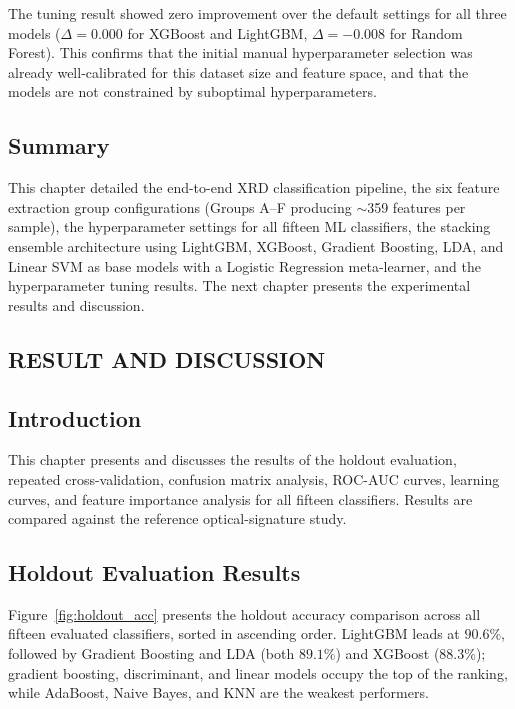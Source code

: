 \documentclass[12pt, oneside]{article} %
\begin{document}
The tuning result showed zero improvement over the default settings for all three models ($\Delta = 0.000$ for XGBoost and LightGBM, $\Delta = -0.008$ for Random Forest). This confirms that the initial manual hyperparameter selection was already well-calibrated for this dataset size and feature space, and that the models are not constrained by suboptimal hyperparameters.


\subsection{Summary}

This chapter detailed the end-to-end XRD classification pipeline, the six feature extraction group configurations (Groups A--F producing $\sim$359 features per sample), the hyperparameter settings for all fifteen ML classifiers, the stacking ensemble architecture using LightGBM, XGBoost, Gradient Boosting, LDA, and Linear SVM as base models with a Logistic Regression meta-learner, and the hyperparameter tuning results. The next chapter presents the experimental results and discussion.



\vfill \null

\newpage

\vfill \null
\thispagestyle{empty}
\begin{center}
\section{RESULT AND DISCUSSION}
\end{center}
\vspace{2cm}


\subsection{Introduction}

This chapter presents and discusses the results of the holdout evaluation, repeated cross-validation, confusion matrix analysis, ROC-AUC curves, learning curves, and feature importance analysis for all fifteen classifiers. Results are compared against the reference optical-signature study.


\subsection{Holdout Evaluation Results}

Figure~\ref{fig:holdout_acc} presents the holdout accuracy comparison across all fifteen evaluated classifiers, sorted in ascending order. LightGBM leads at $90.6\%$, followed by Gradient Boosting and LDA (both $89.1\%$) and XGBoost ($88.3\%$); gradient boosting, discriminant, and linear models occupy the top of the ranking, while AdaBoost, Naive Bayes, and KNN are the weakest performers.
\end{document}
